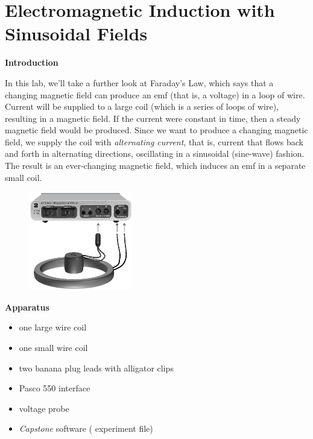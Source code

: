 
\section{Electromagnetic Induction with Sinusoidal Fields}

\makelabheader %

\bigskip

\textbf{Introduction}

In this lab, we'll take a further look at Faraday's Law, which says
that a changing magnetic field can produce an emf (that is, a voltage)
in a loop of wire.  Current will be supplied to a large coil (which is a 
series of loops of wire), resulting in a magnetic field.  
If the current were constant in time,
then a steady magnetic field would be produced.  Since we want to
produce a changing magnetic field, we supply the coil with {\it
alternating current}, that is, current that flows back and forth in
alternating directions, oscillating in a sinusoidal (sine-wave) fashion.  The
result is an ever-changing magnetic field, which induces an emf in
a separate small coil.

\begin{figure}
\vspace{0.4in}

\hspace{0.4in}
    \includegraphics[width=0.4\textwidth]{induction_sinusoidal/induction2_setup_550.eps}
\end{figure}

\bigskip

\textbf{Apparatus}
\begin{itemize}
\setlength\itemsep{0pt} %
\item one large wire coil
\item one small wire coil
\item two banana plug leads with alligator clips
\item Pasco 550 interface
\item voltage probe
\item \textit{Capstone} software ( experiment file)
\end{itemize}

